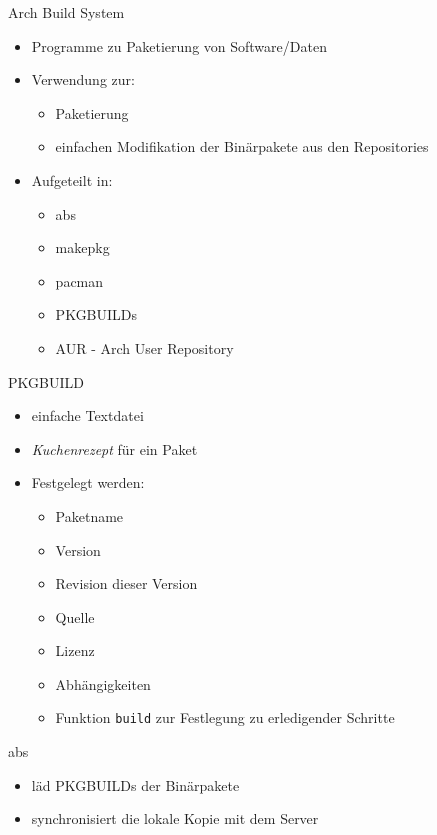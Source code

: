 
\begin{slide}{Arch Build System}
	\begin{itemize}
		\item{Programme zu Paketierung von Software/Daten}
		\item{Verwendung zur:
			\begin{itemize}
				\item{Paketierung}
				\item{einfachen Modifikation der Bin\"{a}rpakete aus den Repositories}
			\end{itemize}
		}
		\item{Aufgeteilt in:
			\begin{itemize}
				\item{abs}
				\item{makepkg}
				\item{pacman}
				\item{PKGBUILDs}
				\item{AUR - Arch User Repository}
			\end{itemize}
		}
	\end{itemize}
\end{slide}


\begin{slide}{PKGBUILD}
	\begin{itemize}
		\item{einfache Textdatei}
		\item{\textit{Kuchenrezept} f\"{u}r ein Paket}
		\item{Festgelegt werden:
			\begin{itemize}
				\item{Paketname}
				\item{Version}
				\item{Revision dieser Version}
				\item{Quelle}
				\item{Lizenz}
				\item{Abh\"{a}ngigkeiten}
				\item{Funktion \texttt{build} zur Festlegung zu erledigender Schritte}
			\end{itemize}
		}
	\end{itemize}
\end{slide}

\begin{slide}{abs}
	\begin{itemize}
		\item{l\"{a}d PKGBUILDs der Bin\"{a}rpakete}
		\item{synchronisiert die lokale Kopie mit dem Server}
	\end{itemize}
\end{slide}


